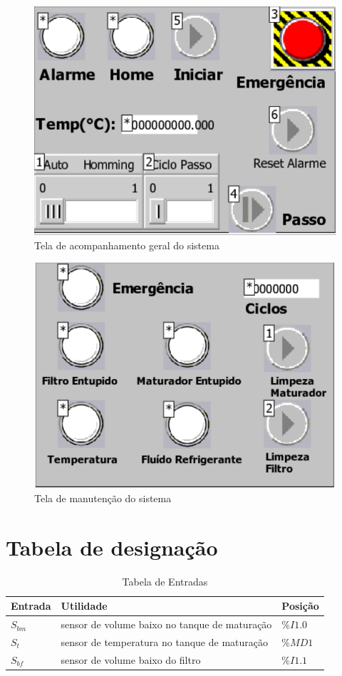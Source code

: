 \documentclass[twoside,twocolumn, 12pt]{paper}
\begin{document}
	\begin{figure}
		\centering
		\includegraphics [width=0.8\columnwidth]{ihmsmall.pdf}
		\caption{Tela de acompanhamento geral do sistema}
		\label{fig:ihm}
	\end{figure}
	
	\begin{figure}
		\centering
		\includegraphics [width=0.8\columnwidth]{screen1small.pdf}
		\caption{Tela de manutenção do sistema}
		\label{fig:screen1}
	\end{figure}

\section {Tabela de designação}
\begin{table}[b]
	\caption{Tabela de Entradas}
	\label{tab:in}
	\centering
	\begin{tabular}{|  p{2cm} | p{10cm} | p{2cm} | }
		\hline
		Entrada & Utilidade & Posição\\
		\hline
		$S_{bm}$ & sensor de volume baixo no tanque de maturação & $\%I1.0$ \\
		$S_t$ & sensor de temperatura no tanque de maturação & $\%MD1$ \\
		$S_{bf}$ & sensor de volume baixo do filtro & $\%I1.1$ \\
		\hline
	\end{tabular}
\end{table}
\end{document}
